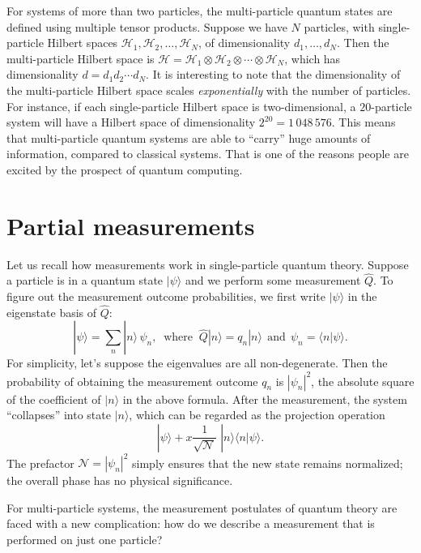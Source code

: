 \documentclass[pra,11pt]{revtex4}
\begin{document}
For systems of more than two particles, the multi-particle quantum
states are defined using multiple tensor products.  Suppose we have
$N$ particles, with single-particle Hilbert spaces $\mathscr{H}_1,
\mathscr{H}_2, \dots, \mathscr{H}_N$, of dimensionality $d_1, \dots,
d_N$.  Then the multi-particle Hilbert space is $\mathscr{H} =
\mathscr{H}_1 \otimes \mathscr{H}_2 \otimes \cdots \otimes
\mathscr{H}_N$, which has dimensionality $d = d_1 d_2\cdots d_N$.  It
is interesting to note that the dimensionality of the multi-particle
Hilbert space scales \textit{exponentially} with the number of
particles.  For instance, if each single-particle Hilbert space is
two-dimensional, a $20$-particle system will have a Hilbert space of
dimensionality $2^{20} =1\,048\,576$.  This means that multi-particle
quantum systems are able to ``carry'' huge amounts of information,
compared to classical systems.  That is one of the reasons people are
excited by the prospect of quantum computing.

\section{Partial measurements}

Let us recall how measurements work in single-particle quantum
theory.  Suppose a particle is in a quantum state $|\psi\rangle$
and we perform some measurement $\hat{Q}$.  To figure out the
measurement outcome probabilities, we first write $|\psi\rangle$ in
the eigenstate basis of $\hat{Q}$:
$$|\psi\rangle = \sum_n |n\rangle\,\psi_n, \;\;\mathrm{where}\;\;\hat{Q}|n\rangle = q_n |n\rangle \;\,\textrm{and}\;\, \psi_n = \langle n|\psi\rangle.$$
For simplicity, let's suppose the eigenvalues are all non-degenerate.
Then the probability of obtaining the measurement outcome $q_n$ is
$|\psi_n|^2$, the absolute square of the coefficient of
$|n\rangle$ in the above formula.  After the measurement, the system
``collapses'' into state $|n\rangle$, which can be regarded as the
projection operation
$$|\psi\rangle +\!x \frac{1}{\sqrt{\mathcal{N}}}\; |n\rangle\langle n|\psi\rangle.$$
The prefactor $\mathcal{N} = |\psi_n|^2$ simply ensures that the new
state remains normalized; the overall phase has no physical
significance.

For multi-particle systems, the measurement postulates of quantum
theory are faced with a new complication: how do we describe a
measurement that is performed on just one particle?
\end{document}
